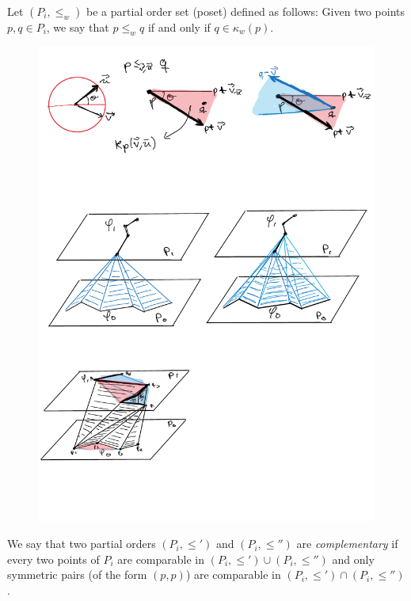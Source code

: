 \documentclass[a4paper, 11pt]{article}
\newcommand{\ve}{{\ensuremath{\vec{v}}}}
\newcommand{\ue}{{\ensuremath{\vec{u}}}}
\newcommand{\we}{{\ensuremath{w}}}
\newcommand{\cone}[1]{\ensuremath{\kappa_{\we}(#1)}}
\newcommand{\lt}{\ensuremath{ \leq_{\we}}}
\begin{document}
Let $(P_i, \lt)$ be a partial order set (poset) defined as follows:
Given two points $p,q\in P_i$, we say that $p \lt q$ if and only if $q\in \cone{p}$.

\begin{figure}[tb]
\centering
\includegraphics[width=1\textwidth]{img/Cones.pdf}
\caption{\small }
\label{fig:Cones}
\end{figure}

We say that two partial orders $(P_i, \leq')$ and $(P_i, \leq'')$ are \emph{complementary} if every two points of $P_i$ are comparable in $(P_i, \leq')\cup(P_i, \leq'')$ and only symmetric pairs (of the form $(p, p)$) are comparable in $(P_i, \leq')\cap(P_i, \leq'')$.

\end{document}
